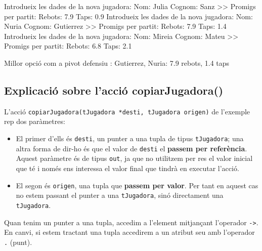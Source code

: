 \documentclass[
]{book}
\newenvironment{Shaded}{\begin{snugshade}}{\end{snugshade}}
\newcommand{\FloatTok}[1]{\textcolor[rgb]{0.00,0.00,0.81}{#1}}
\newcommand{\NormalTok}[1]{#1}
\providecommand{\tightlist}{%
  \setlength{\itemsep}{0pt}\setlength{\parskip}{0pt}}
\begin{document}
\begin{Shaded}
\begin{Highlighting}[]
\NormalTok{Introdueix les dades de la nova jugadora: }
\NormalTok{    Nom: Julia}
\NormalTok{    Cognom: Sanz}
\NormalTok{    \textgreater{}\textgreater{} Promigs per partit:}
\NormalTok{    Rebots: }\FloatTok{7.9}
\NormalTok{    Taps: }\FloatTok{0.9}
\NormalTok{Introdueix les dades de la nova jugadora: }
\NormalTok{    Nom: Nuria}
\NormalTok{    Cognom: Gutierrez}
\NormalTok{    \textgreater{}\textgreater{} Promigs per partit:}
\NormalTok{    Rebots: }\FloatTok{7.9}
\NormalTok{    Taps: }\FloatTok{1.4}
\NormalTok{Introdueix les dades de la nova jugadora: }
\NormalTok{    Nom: Mireia}
\NormalTok{    Cognom: Mateu}
\NormalTok{    \textgreater{}\textgreater{} Promigs per partit:}
\NormalTok{    Rebots: }\FloatTok{6.8}
\NormalTok{    Taps: }\FloatTok{2.1}

\NormalTok{Millor opció com a pivot defensiu : }
\NormalTok{Gutierrez, Nuria: }\FloatTok{7.9}\NormalTok{ rebots, }\FloatTok{1.4}\NormalTok{ taps }
\end{Highlighting}
\end{Shaded}

\hypertarget{explicaciuxf3-sobre-lacciuxf3-copiarjugadora}{%
\subsection{Explicació sobre l'acció copiarJugadora()}\label{explicaciuxf3-sobre-lacciuxf3-copiarjugadora}}

L'acció \texttt{copiarJugadora(tJugadora\ *desti,\ tJugadora\ origen)} de l'exemple rep dos paràmetres:

\begin{itemize}
\tightlist
\item
  El primer d'ells és \texttt{desti}, un punter a una tupla de tipus \texttt{tJugadora}; una altra forma de dir-ho és que el valor de \texttt{desti} el \textbf{passem per referència}. Aquest paràmetre és de tipus \texttt{out}, ja que no utilitzem per res el valor inicial que té i només ens interessa el valor final que tindrà en executar l'acció.
\item
  El segon és \texttt{origen}, una tupla que \textbf{passem per valor}. Per tant en aquest cas no estem passant el punter a una \texttt{tJugadora}, sinó directament una \texttt{tJugadora}.
\end{itemize}

Quan tenim un punter a una tupla, accedim a l'element mitjançant l'operador \texttt{-\textgreater{}}. En canvi, si estem tractant una tupla accedirem a un atribut seu amb l'operador \texttt{.} (punt).
\end{document}
